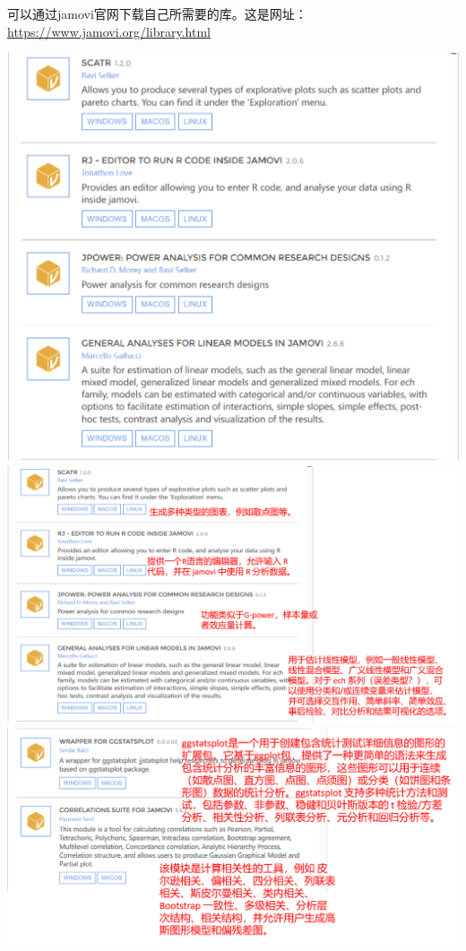 \documentclass[
]{book}
\begin{document}
可以通过jamovi官网下载自己所需要的库。这是网址：\url{https://www.jamovi.org/library.html}

\includegraphics{img/jamovi/modules1.png}\\
\includegraphics{img/jamovi/modules2.png}\\
\includegraphics{img/jamovi/modules3.png}\\
\end{document}
